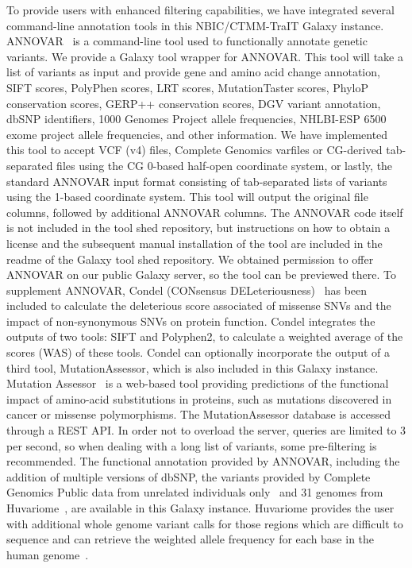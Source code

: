To provide users with enhanced filtering capabilities, we have integrated several command-line annotation tools in this NBIC/CTMM-TraIT Galaxy instance. ANNOVAR~\cite{annovar} is a command-line tool used to functionally annotate genetic variants. We provide a Galaxy tool wrapper for ANNOVAR\@. This tool will take a list of variants as input and provide gene and amino acid change annotation, SIFT scores, PolyPhen scores, LRT scores, MutationTaster scores, PhyloP conservation scores, GERP++ conservation scores, DGV variant annotation, dbSNP identifiers, 1000 Genomes Project allele frequencies, NHLBI-ESP 6500 exome project allele frequencies, and other information. We have implemented this tool to accept VCF (v4) files, Complete Genomics varfiles or CG-derived tab-separated files using the CG 0-based half-open coordinate system, or lastly, the standard ANNOVAR input format consisting of tab-separated lists of variants using the 1-based coordinate system. This tool will output the original file columns, followed by additional ANNOVAR columns. The ANNOVAR code itself is not included in the tool shed repository, but instructions on how to obtain a license and the subsequent manual installation of the tool are included in the readme of the Galaxy tool shed repository. We obtained permission to offer ANNOVAR on our public Galaxy server, so the tool can be previewed there. To supplement ANNOVAR, Condel (CONsensus DELeteriousness)~\cite{condel} has been included to calculate the deleterious score associated of missense SNVs and the impact of non-synonymous SNVs on protein function. Condel integrates the outputs of two tools: SIFT and Polyphen2, to calculate a weighted average of the scores (WAS) of these tools. Condel can optionally incorporate the output of a third tool, MutationAssessor, which is also included in this Galaxy instance. Mutation Assessor~\cite{mutass} is a web-based tool providing predictions of the functional impact of amino-acid substitutions in proteins, such as mutations discovered in cancer or missense polymorphisms. The MutationAssessor database is accessed through a REST API\@. In order not to overload the server, queries are limited to 3 per second, so when dealing with a long list of variants, some pre-filtering is recommended. The functional annotation provided by ANNOVAR, including the addition of multiple versions of dbSNP, the variants provided by Complete Genomics Public data from unrelated individuals only~\cite{url-cgftp} and 31 genomes from Huvariome~\cite{huvariome}, are available in this Galaxy instance. Huvariome provides the user with additional whole genome variant calls for those regions which are difficult to sequence and can retrieve the weighted allele frequency for each base in the human genome~\cite{huvariome}.



